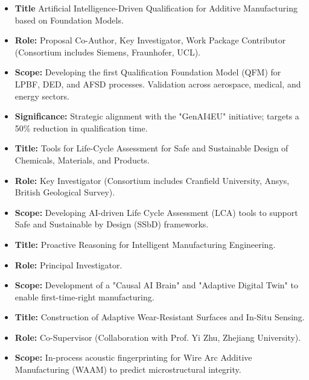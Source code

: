 \documentclass{resume}
\begin{document}
\begin{itemize}[parsep=0.5ex]
  \item \textbf{Title} Artificial Intelligence-Driven Qualification for Additive Manufacturing based on Foundation Models.
  \item \textbf{Role:} Proposal Co-Author, Key Investigator,  Work Package Contributor (Consortium includes Siemens, Fraunhofer, UCL).
  \item \textbf{Scope:} Developing the first Qualification Foundation Model (QFM) for LPBF, DED, and AFSD processes. Validation across aerospace, medical, and energy sectors.
  \item \textbf{Significance:} Strategic alignment with the "GenAI4EU" initiative; targets a 50\% reduction in qualification time.
\end{itemize}

\begin{itemize}[parsep=0.5ex]
  \item \textbf{Title:} Tools for Life-Cycle Assessment for Safe and Sustainable Design of Chemicals, Materials, and Products.
  \item \textbf{Role:} Key Investigator (Consortium includes Cranfield University, Ansys, British Geological Survey).
  \item \textbf{Scope:} Developing AI-driven Life Cycle Assessment (LCA) tools to support Safe and Sustainable by Design (SSbD) frameworks.
\end{itemize}

\begin{itemize}[parsep=0.5ex]
  \item \textbf{Title:} Proactive Reasoning for Intelligent Manufacturing Engineering.
  \item \textbf{Role:} Principal Investigator.
  \item \textbf{Scope:} Development of a "Causal AI Brain" and "Adaptive Digital Twin" to enable first-time-right manufacturing.
\end{itemize}

\begin{itemize}[parsep=0.5ex]
  \item \textbf{Title:} Construction of Adaptive Wear-Resistant Surfaces and In-Situ Sensing.
  \item \textbf{Role:} Co-Supervisor (Collaboration with Prof. Yi Zhu, Zhejiang University).
  \item \textbf{Scope:} In-process acoustic fingerprinting for Wire Arc Additive Manufacturing (WAAM) to predict microstructural integrity.
\end{itemize}
\end{document}
